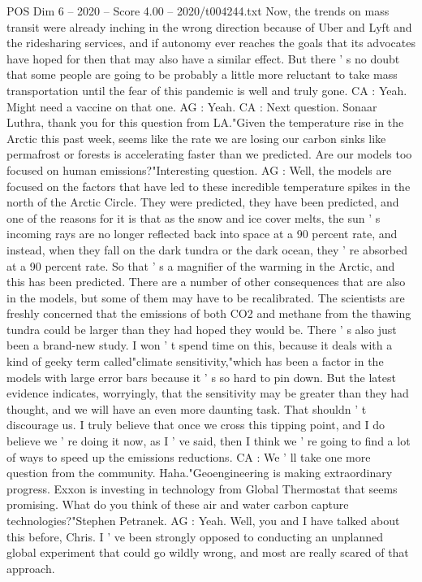 \begin{textsample}{POS Dim 6 – 2020 – Score 4.00 – 2020/t004244.txt}
Now, the trends on mass transit were already inching in the wrong direction because of Uber and Lyft and the ridesharing services, and if autonomy ever reaches the goals that its advocates have hoped for then that may also have a similar effect.
But there ' s no doubt that some people are going to be probably a little more reluctant to take mass transportation until the fear of this pandemic is well and truly gone.
CA : Yeah.
Might need a vaccine on that one.
AG : Yeah.
CA : Next question.
Sonaar Luthra, thank you for this question from LA."Given the temperature rise in the Arctic this past week, seems like the rate we are losing our carbon sinks like permafrost or forests is accelerating faster than we predicted.
Are our models too focused on human emissions?"Interesting question.
AG : Well, the models are focused on the factors that have led to these incredible temperature spikes in the north of the Arctic Circle.
They were predicted, they have been predicted, and one of the reasons for it is that as the snow and ice cover melts, the sun ' s incoming rays are no longer reflected back into space at a 90 percent rate, and instead, when they fall on the dark tundra or the dark ocean, they ' re absorbed at a 90 percent rate.
So that ' s a magnifier of the warming in the Arctic, and this has been predicted.
There are a number of other consequences that are also in the models, but some of them may have to be recalibrated.
The scientists are freshly concerned that the emissions of both CO2 and methane from the thawing tundra could be larger than they had hoped they would be.
There ' s also just been a brand-new study.
I won ' t spend time on this, because it deals with a kind of geeky term called"climate sensitivity,"which has been a factor in the models with large error bars because it ' s so hard to pin down.
But the latest evidence indicates, worryingly, that the sensitivity may be greater than they had thought, and we will have an even more daunting task.
That shouldn ' t discourage us.
I truly believe that once we cross this tipping point, and I do believe we ' re doing it now, as I ' ve said, then I think we ' re going to find a lot of ways to speed up the emissions reductions.
CA : We ' ll take one more question from the community.
Haha."Geoengineering is making extraordinary progress.
Exxon is investing in technology from Global Thermostat that seems promising.
What do you think of these air and water carbon capture technologies?"Stephen Petranek.
AG : Yeah.
Well, you and I have talked about this before, Chris.
I ' ve been strongly opposed to conducting an unplanned global experiment that could go wildly wrong, and most are really scared of that approach.

\end{textsample}
